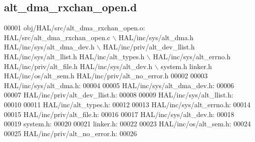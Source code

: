 \subsection{alt\+\_\+dma\+\_\+rxchan\+\_\+open.\+d}
\label{alt__dma__rxchan__open_8d_source}

\begin{DoxyCode}
00001 obj/HAL/src/alt_dma_rxchan_open.o: HAL/src/alt_dma_rxchan_open.c \(\backslash\)
 HAL/inc/sys/alt\_dma.h HAL/inc/sys/alt\_dma\_dev.h \(\backslash\)
 HAL/inc/priv/alt_dev_llist.h HAL/inc/sys/alt_llist.h HAL/inc/alt\_types.h \(\backslash\)
 HAL/inc/sys/alt_errno.h HAL/inc/priv/alt\_file.h HAL/inc/sys/alt_dev.h \(\backslash\)
 system.h linker.h HAL/inc/os/alt\_sem.h HAL/inc/priv/alt_no_error.h
00002 
00003 HAL/inc/sys/alt\_dma.h:
00004 
00005 HAL/inc/sys/alt\_dma\_dev.h:
00006 
00007 HAL/inc/priv/alt_dev_llist.h:
00008 
00009 HAL/inc/sys/alt_llist.h:
00010 
00011 HAL/inc/alt\_types.h:
00012 
00013 HAL/inc/sys/alt_errno.h:
00014 
00015 HAL/inc/priv/alt\_file.h:
00016 
00017 HAL/inc/sys/alt_dev.h:
00018 
00019 system.h:
00020 
00021 linker.h:
00022 
00023 HAL/inc/os/alt\_sem.h:
00024 
00025 HAL/inc/priv/alt_no_error.h:
00026 \end{DoxyCode}
